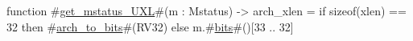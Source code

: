 function #\hyperref[sailRISCVzgetzymstatuszyUXL]{get\_mstatus\_UXL}#(m : Mstatus) -> arch_xlen = {
  if   sizeof(xlen) == 32
  then #\hyperref[sailRISCVzarchzytozybits]{arch\_to\_bits}#(RV32)
  else m.#\hyperref[sailRISCVzbits]{bits}#()[33 .. 32]
}
